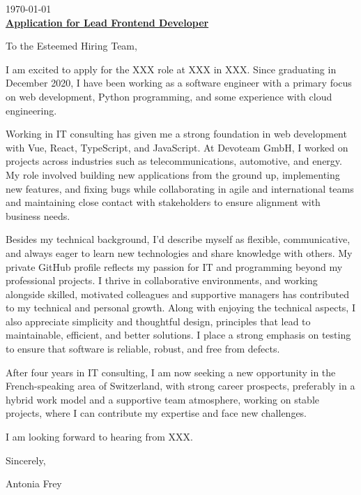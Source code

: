 \documentclass[10pt, a4paper]{article}
\begin{document}
\bigskip %

\hfill \today \bigskip\\ %

\noindent \textbf{\underline{Application for Lead Frontend Developer}}

To the Esteemed Hiring Team,
\bigskip

I am excited to apply for the XXX role at XXX in XXX. Since graduating in December 2020, I have been working as a software engineer with a primary focus on web development, Python programming, and some experience with cloud engineering.

Working in IT consulting has given me a strong foundation in web development with Vue, React, TypeScript, and JavaScript. At Devoteam GmbH, I worked on projects across industries such as telecommunications, automotive, and energy. My role involved building new applications from the ground up, implementing new features, and fixing bugs while collaborating in agile and international teams and maintaining close contact with stakeholders to ensure alignment with business needs.

Besides my technical background, I’d describe myself as flexible, communicative, and always eager to learn new technologies and share knowledge with others. My private GitHub profile reflects my passion for IT and programming beyond my professional projects. I thrive in collaborative environments, and working alongside skilled, motivated colleagues and supportive managers has contributed to my technical and personal growth. Along with enjoying the technical aspects, I also appreciate simplicity and thoughtful design, principles that lead to maintainable, efficient, and better solutions. I place a strong emphasis on testing to ensure that software is reliable, robust, and free from defects.

After four years in IT consulting, I am now seeking a new opportunity in the French-speaking area of Switzerland, with strong career prospects, preferably in a hybrid work model and a supportive team atmosphere, working on stable projects, where I can contribute my expertise and face new challenges.

I am looking forward to hearing from XXX. 

\bigskip

Sincerely,

\vspace{20pt}

Antonia Frey
\end{document}
